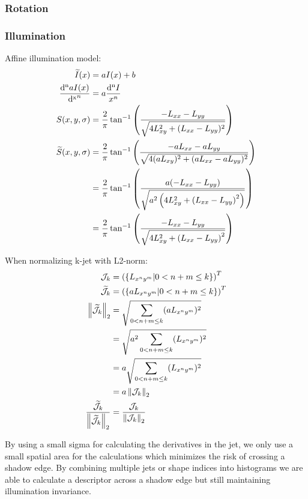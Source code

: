 \documentclass[../thesis.tex]{subfiles}
\begin{document}
\subsubsection{Rotation}

\subsubsection{Illumination}
Affine illumination model:
\begin{align*}
  \widetilde{I}(x) &= a I(x)  + b \\
  \frac{\mathop{}\!\mathrm{d^n} a I(x)}{\mathop{}\!\mathrm{d^x}^n} &= a \frac{\mathop{}\!\mathrm{d^n}I}{ x^n} \\
  S(x,y,\sigma) &= \frac{2}{\pi} \tan^{-1} \left( \frac{-L_{xx} - L_{yy}}{\sqrt{4L_{xy}^2 + (L_{xx} - L_{yy})^2}} \right) \\
  \widetilde{S}(x,y,\sigma) &= \frac{2}{\pi} \tan^{-1} \left( \frac{-a L_{xx} - a L_{yy}}{\sqrt{4(aL_{xy})^2 + (aL_{xx} - aL_{yy})^2}} \right) \\
  &= \frac{2}{\pi} \tan^{-1} \left( \frac{a (-L_{xx} - L_{yy})}{\sqrt{a^2 \left(4L_{xy}^2 + \left(L_{xx} - L_{yy} \right)^2 \right)}} \right) \\
  &= \frac{2}{\pi} \tan^{-1} \left( \frac{-L_{xx} - L_{yy}}{\sqrt{4L_{xy}^2 + \left(L_{xx} - L_{yy} \right)^2}} \right) \\
\end{align*}


When normalizing k-jet with L2-norm:
\begin{align*}
  \mathcal{J}_k &= \left( \left \lbrace L_{x^n y^m} | 0 < n+m \leq k \right \rbrace \right)^T \\
  \widetilde{\mathcal{J}}_k &=\left( \left \lbrace a L_{x^n y^m} | 0 < n+m \leq k \right \rbrace \right)^T \\
  \left \| \widetilde{\mathcal{J}}_k \right \|_2 &= \sqrt{\sum_{0 < n+m \leq k} (a L_{x^n y^m})^2} \\
      &= \sqrt{a^2\sum_{0 < n+m \leq k} (L_{x^n y^m})^2} \\
      &= a\sqrt{\sum_{0 < n+m \leq k} (L_{x^n y^m})^2} \\
      &= a \left \| \mathcal{J}_k \right \|_2 \\
  \frac{\widetilde{\mathcal{J}}_k}{\left \| \widetilde{\mathcal{J}}_k \right \|_2} &=
      \frac{\mathcal{J}_k}{\left \| \mathcal{J}_k \right \|_2}
\end{align*}

By using a small sigma for calculating the derivatives in the jet, we only use a small spatial area for the calculations which minimizes the risk of crossing a shadow edge. By combining multiple jets or shape indices into histograms we are able to calculate a descriptor across a shadow edge but still maintaining illumination invariance.
\end{document}
